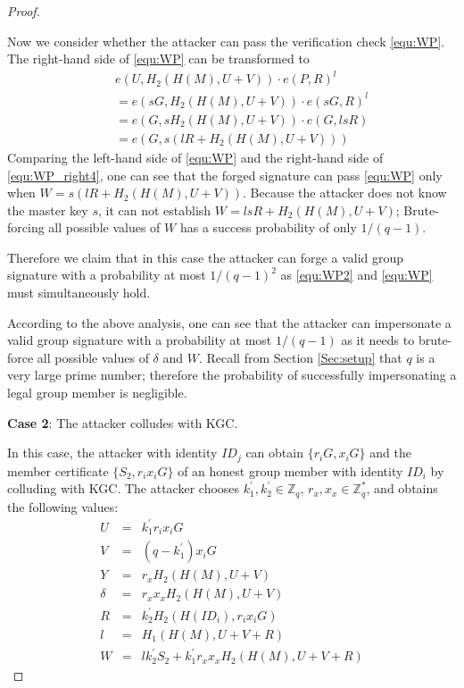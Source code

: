\documentclass[letterpaper,12pt]{article}
\begin{document}
\begin{proof}
\begin{itemize}
Now we consider whether the attacker can pass the verification check \eqref{equ:WP}. The right-hand side of \eqref{equ:WP} can be transformed to
\begin{eqnarray} \label{equ:WP_right4}
&&e(U, H_2(H(M), U+V))\cdot e(P, R)^l \nonumber\\
&&=e(sG, H_2(H(M),U+V))\cdot e(sG, R)^l \nonumber\\
&&=e(G, sH_2(H(M),U+V))\cdot e(G,lsR) \nonumber\\
&&=e(G, s(lR+H_2(H(M),U+V)))
\end{eqnarray}
Comparing the left-hand side of \eqref{equ:WP} and  the right-hand side of \eqref{equ:WP_right4}, one can see that the forged signature can pass \eqref{equ:WP} only when $W=s(lR+H_2(H(M),U+V))$. Because the attacker does not know the master key $s$, it can not establish $W=lsR+H_2(H(M),U+V)$;  Brute-forcing all possible values of $W$ has a success probability of only $1/(q-1)$.

Therefore we claim that in this case the attacker can forge a valid group signature with a probability at most $1/(q-1)^2$ as \eqref{equ:WP2} and \eqref{equ:WP} must simultaneously hold.
\end{itemize}

According to the above analysis, one can see that the attacker can impersonate a valid group signature with a probability at most $1/(q-1)$ as it needs to  brute-force all possible values of $\delta$ and $W$. Recall from Section \ref{Sec:setup} that $q$ is a very large prime number; therefore the probability of successfully impersonating a legal group member is negligible.


\textbf{Case 2}: The attacker colludes with KGC.

In this case, the attacker with identity $ID_j$ can obtain $\{r_iG, x_iG\}$ and the member certificate $\{S_2, r_ix_iG\}$ of an honest group member with identity $ID_i$ by colluding with KGC. The attacker chooses $k_1^\prime, k_2^{\prime}\in \mathbb{Z}_q$, $r_x, x_x\in\mathbb{Z}_q^*$, and obtains the following values:
\begin{eqnarray}
U&=&k_1^{\prime}r_ix_iG\nonumber\\
 V&=&(q-k_1^{\prime})x_iG\nonumber\\
Y&=&r_xH_2(H(M), U+V)\nonumber\\
\delta &=&r_xx_xH_2(H(M), U+V)\nonumber\\
R&=&k_2^{\prime}H_2(H(ID_i), r_ix_iG)\nonumber\\
l&=&H_1(H(M), U+V+R)\nonumber\\
W&=&lk_2^\prime S_2+k_1^{\prime}r_xx_xH_2(H(M), U+V+R)\nonumber
\end{eqnarray}


\end{proof}
\end{document}
